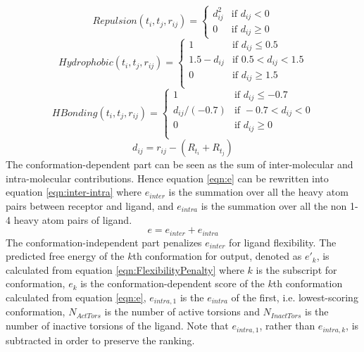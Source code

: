 \documentclass[10pt]{article}
\begin{document}
\begin{equation}
\label{eqn:Repulsion}
Repulsion(t_i, t_j, r_{ij}) =
\begin{cases}
d_{ij}^2 & \text{if } d_{ij} < 0\\
0 &\text{if } d_{ij} \geq 0
\end{cases}
\end{equation}
\begin{equation}
\label{eqn:Hydrophobic}
Hydrophobic(t_i, t_j, r_{ij}) =
\begin{cases}
1 & \text{if } d_{ij} \leq 0.5\\
1.5 - d_{ij} & \text{if } 0.5 < d_{ij} < 1.5\\
0 & \text{if } d_{ij} \geq 1.5\\
\end{cases}
\end{equation}
\begin{equation}
\label{eqn:HBonding}
HBonding(t_i, t_j, r_{ij}) =
\begin{cases}
1 & \text{if } d_{ij} \leq -0.7\\
d_{ij} / (-0.7) & \text{if } -0.7 < d_{ij} < 0\\
0 & \text{if } d_{ij} \geq 0\\
\end{cases}
\end{equation}
\begin{equation}
\label{eqn:dij}
d_{ij} = r_{ij} - (R_{t_i} + R_{t_j})
\end{equation}
The conformation-dependent part can be seen as the sum of inter-molecular and intra-molecular contributions. Hence equation \eqref{eqn:e} can be rewritten into equation \eqref{eqn:inter-intra} where $e_{inter}$ is the summation over all the heavy atom pairs between receptor and ligand, and $e_{intra}$ is the summation over all the non 1-4 heavy atom pairs of ligand.
\begin{equation}
\label{eqn:inter-intra}
e = e_{inter} + e_{intra}
\end{equation}
The conformation-independent part penalizes $e_{inter}$ for ligand flexibility. The predicted free energy of the $k$th conformation for output, denoted as $e'_k$, is calculated from equation \eqref{eqn:FlexibilityPenalty} where $k$ is the subscript for conformation, $e_k$ is the conformation-dependent score of the $k$th conformation calculated from equation \eqref{eqn:e}, $e_{intra,1}$ is the $e_{intra}$ of the first, i.e. lowest-scoring conformation, $N_{ActTors}$ is the number of active torsions and $N_{InactTors}$ is the number of inactive torsions of the ligand. Note that $e_{intra,1}$, rather than $e_{intra,k}$, is subtracted in order to preserve the ranking.
\end{document}
